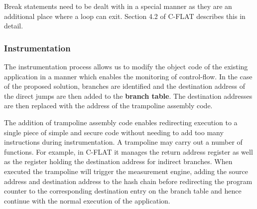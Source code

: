 Break statements need to be dealt with in a special manner as they are an additional place where a loop can exit. Section 4.2 of C-FLAT \cite{Abera2016} describes this in detail.

\subsubsection*{Instrumentation}

The instrumentation process allows us to modify the object code of the existing application in a manner which enables the monitoring of control-flow. In the case of the proposed solution, branches are identified and the destination address of the direct jumps are then added to the \textbf{branch table}. The destination addresses are then replaced with the address of the trampoline assembly code. 

The addition of trampoline assembly code enables redirecting execution to a single piece of simple and secure code without needing to add too many instructions during instrumentation. A trampoline may carry out a number of functions. For example, in C-FLAT \cite{Abera2016} it manages the return address register as well as the register holding the destination address for indirect branches. When executed the trampoline will trigger the measurement engine, adding the source address and destination address to the hash chain before redirecting the program counter to the corresponding destination entry on the branch table and hence continue with the normal execution of the application.